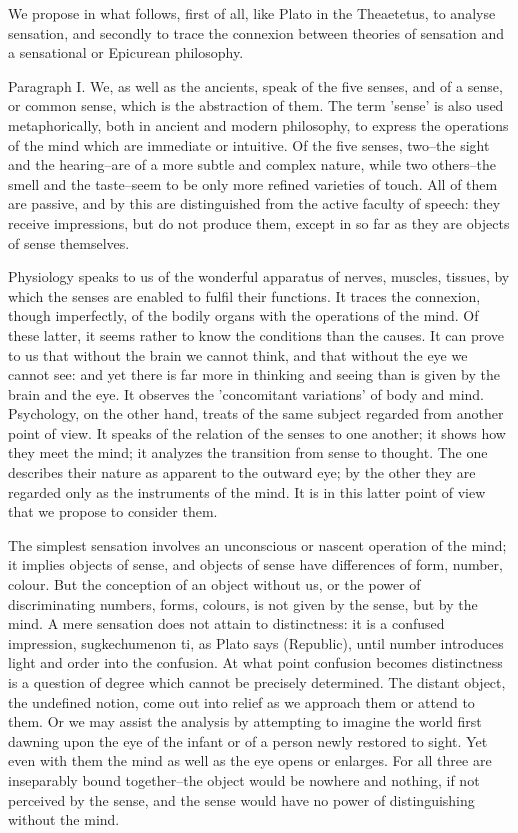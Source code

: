 We propose in what follows, first of all, like Plato in the Theaetetus,
to analyse sensation, and secondly to trace the connexion between
theories of sensation and a sensational or Epicurean philosophy.

Paragraph I. We, as well as the ancients, speak of the five senses, and
of a sense, or common sense, which is the abstraction of them. The
term 'sense' is also used metaphorically, both in ancient and modern
philosophy, to express the operations of the mind which are immediate or
intuitive. Of the five senses, two--the sight and the hearing--are of
a more subtle and complex nature, while two others--the smell and the
taste--seem to be only more refined varieties of touch. All of them
are passive, and by this are distinguished from the active faculty of
speech: they receive impressions, but do not produce them, except in so
far as they are objects of sense themselves.

Physiology speaks to us of the wonderful apparatus of nerves, muscles,
tissues, by which the senses are enabled to fulfil their functions. It
traces the connexion, though imperfectly, of the bodily organs with the
operations of the mind. Of these latter, it seems rather to know the
conditions than the causes. It can prove to us that without the brain we
cannot think, and that without the eye we cannot see: and yet there is
far more in thinking and seeing than is given by the brain and the eye.
It observes the 'concomitant variations' of body and mind. Psychology,
on the other hand, treats of the same subject regarded from another
point of view. It speaks of the relation of the senses to one another;
it shows how they meet the mind; it analyzes the transition from sense
to thought. The one describes their nature as apparent to the outward
eye; by the other they are regarded only as the instruments of the mind.
It is in this latter point of view that we propose to consider them.

The simplest sensation involves an unconscious or nascent operation
of the mind; it implies objects of sense, and objects of sense have
differences of form, number, colour. But the conception of an object
without us, or the power of discriminating numbers, forms, colours,
is not given by the sense, but by the mind. A mere sensation does not
attain to distinctness: it is a confused impression, sugkechumenon ti,
as Plato says (Republic), until number introduces light and order
into the confusion. At what point confusion becomes distinctness is a
question of degree which cannot be precisely determined. The distant
object, the undefined notion, come out into relief as we approach
them or attend to them. Or we may assist the analysis by attempting
to imagine the world first dawning upon the eye of the infant or of a
person newly restored to sight. Yet even with them the mind as well
as the eye opens or enlarges. For all three are inseparably bound
together--the object would be nowhere and nothing, if not perceived by
the sense, and the sense would have no power of distinguishing without
the mind.


